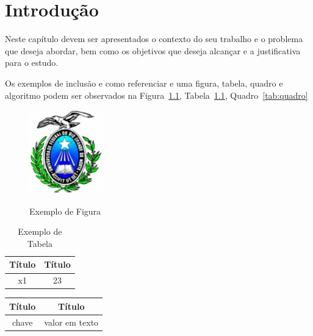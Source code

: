 


\chapter{Introdução}
    \label{cha:intro}

    Neste capítulo devem ser apresentados o contexto do seu trabalho e o problema que deseja abordar, bem como os objetivos que deseja alcançar e a justificativa para o estudo.
    
    Os exemplos de inclusão e como referenciar e uma figura, tabela, quadro e algoritmo podem ser observados na Figura~\ref{fig:figura}, Tabela~\ref{tab:tabela}, Quadro~\ref{tab:quadro}
    
    \begin{figure}[h]
        \centering
        \caption{Exemplo de Figura}
        \includegraphics{lib/logoufrn.jpg}
        \label{fig:figura}
    \end{figure}
    
    \begin{table}[h]
        \centering
        \caption{Exemplo de Tabela}
        \begin{tabular}{|c|c|}
            \hline
            \textbf{Título} & \textbf{Título}  \\ \hline %
            x1 & 23 \\ \hline 
        \end{tabular}
        \label{tab:tabela}
    \end{table}
    
    \begin{quadro}[h]
        \centering
        \caption{Exemplo de Quadro}
        \begin{tabular}{c|c}
            \textbf{Título} & \textbf{Título}  \\ \hline
            chave & valor em texto
        \end{tabular}
        \label{tab:quadro}
    \end{quadro}
    
